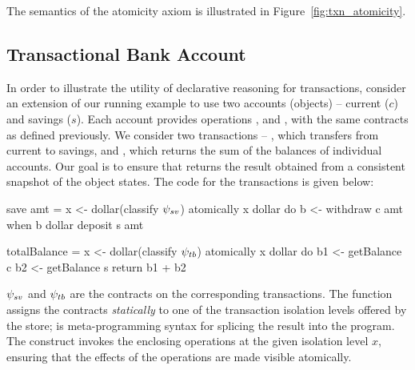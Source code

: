 \noindent The semantics of the atomicity axiom is illustrated in
Figure~\ref{fig:txn_atomicity}.

\subsection{Transactional Bank Account}

In order to illustrate the utility of declarative reasoning for transactions,
consider an extension of our running example to use two accounts (objects) --
current ($c$) and savings ($s$). Each account provides operations
,  and , with the same contracts as
defined previously. We consider two transactions -- , which
transfers  from current to savings, and , which
returns the sum of the balances of individual accounts. Our goal is to ensure
that  returns the result obtained from a consistent snapshot
of the object states. The \quelea code for the transactions is given below:

\hspace{1em}
\begin{minipage}[t]{0.4\columnwidth}
\begin{codehaskell}
save amt =
  x <- dollar(classify $\psi_{sv}$)
  atomically x dollar do
    b <- withdraw c amt
    when b dollar deposit s amt
\end{codehaskell}
\end{minipage}
\hfill
\begin{minipage}[t]{0.4\columnwidth}
\begin{codehaskell}
totalBalance =
  x <- dollar(classify $\psi_{tb}$)
  atomically x dollar do
    b1 <- getBalance c
    b2 <- getBalance s
    return b1 + b2
\end{codehaskell}
\end{minipage}
\hspace{1em}

$\psi_{sv}$ and $\psi_{tb}$ are the contracts on the corresponding
transactions. The function  assigns the contracts
\emph{statically} to one of the transaction isolation levels offered by the
store; \cf{\$()} is meta-programming syntax for splicing the result into the
program. The  construct invokes the enclosing operations at the
given isolation level $x$, ensuring that the effects of the operations are made
visible atomically.

